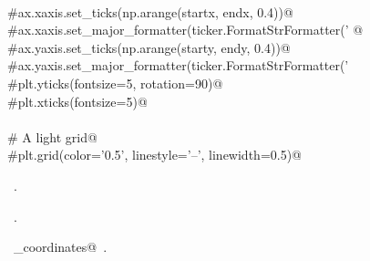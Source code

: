 \documentclass[10pt, english, oneside]{report}
\begin{document}
\begin{appendices}
\begin{flushleft}
\begin{list}{}{}
\mbox{}\verb@@\\
\mbox{}\verb@    #ax.xaxis.set_ticks(np.arange(startx, endx, 0.4))@\\
\mbox{}\verb@    #ax.xaxis.set_major_formatter(ticker.FormatStrFormatter('%0.1f'))@\\
\mbox{}\verb@     @\\
\mbox{}\verb@    #ax.yaxis.set_ticks(np.arange(starty, endy, 0.4))@\\
\mbox{}\verb@    #ax.yaxis.set_major_formatter(ticker.FormatStrFormatter('%0.1f'))@\\
\mbox{}\verb@@\\
\mbox{}\verb@    #plt.yticks(fontsize=5, rotation=90)@\\
\mbox{}\verb@    #plt.xticks(fontsize=5)@\\
\mbox{}\verb@@\\
\mbox{}\verb@    # A light grid@\\
\mbox{}\verb@    #plt.grid(color='0.5', linestyle='--', linewidth=0.5)@\\
\mbox{}\verb@@{\NWsep}
\end{list}
\vspace{-1.5ex}
\footnotesize
\begin{list}{}{\setlength{\itemsep}{-\parsep}\setlength{\itemindent}{-\leftmargin}}
\item \NWtxtMacroDefBy\ .
\item \NWtxtMacroRefIn\ .
\item \NWtxtIdentsUsed\nobreak\  \verb@extract_coordinates@\nobreak\ .
\item{}
\end{list}
\vspace{4ex}
\end{flushleft}





\end{appendices}
\end{document}
